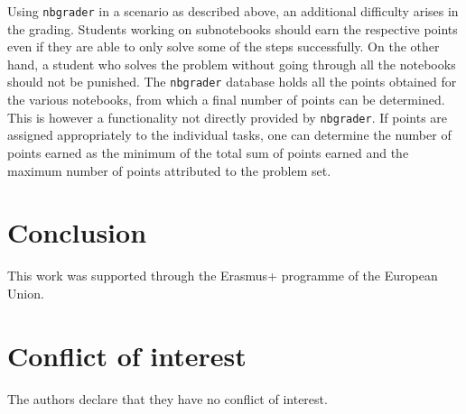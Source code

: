 \documentclass[twocolumn]{svjour3}          %
\begin{document}
Using \texttt{nbgrader} in a scenario as described above, an additional
difficulty arises in the grading. Students working on subnotebooks should earn
the respective points even if they are able to only solve some of the steps
successfully. On the other hand, a student who solves the problem without going
through all the notebooks should not be punished. The \texttt{nbgrader}
database holds all the points obtained for the various notebooks, from which a
final number of points can be determined. This is however a functionality not
directly provided by \texttt{nbgrader}. If points are assigned appropriately to
the individual tasks, one can determine the number of points earned as the
minimum of the total sum of points earned and the maximum number of points
attributed to the problem set.

\section{Conclusion}





\begin{acknowledgements}
This work was supported through the Erasmus+ programme of the
European Union.
\end{acknowledgements}




\section*{Conflict of interest}
The authors declare that they have no conflict of interest.


\end{document}
